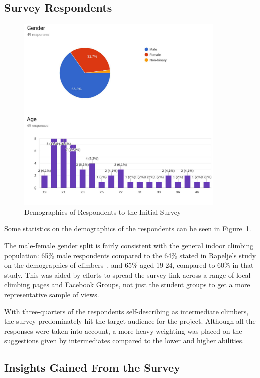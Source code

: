 \subsection{Survey Respondents}
\begin{figure}[h]
\centering
\includegraphics[width=10cm]{imgs/surveydemographics}
\caption{Demographics of Respondents to the Initial Survey}
\label{fig:surveydemographics}
\end{figure}
Some statistics on the demographics of the respondents can be seen in Figure~\ref{fig:surveydemographics}.

The male-female gender split is fairly consistent with the general indoor climbing population: 65\% male respondents compared to the 64\% stated in Rapelje's study on the demographics of climbers~\cite{climbing-sub-worlds}, and 65\% aged 19-24, compared to 60\% in that study.
This was aided by efforts to spread the survey link across a range of local climbing pages and Facebook Groups, not just the student groups to get a more representative sample of views.

With three-quarters of the respondents self-describing as intermediate climbers, the survey predominately hit the target audience for the project. 
Although all the responses were taken into account, a more heavy weighting was placed on the suggestions given by intermediates compared to the lower and higher abilities.



\subsection{Insights Gained From the Survey}
